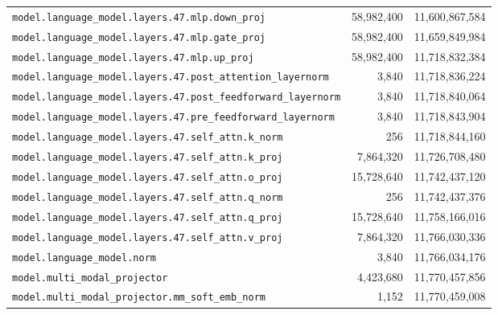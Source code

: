 \documentclass[10pt,a4paper]{article}
\theoremstyle{definition}
\begin{document}
\begin{appendices}
\begin{longtable}{p{9.5cm}rr}
\texttt{model.\allowbreak{}language\_model.\allowbreak{}layers.\allowbreak{}47.\allowbreak{}mlp.\allowbreak{}down\_proj} & 58,982,400 & 11,600,867,584 \\
\texttt{model.\allowbreak{}language\_model.\allowbreak{}layers.\allowbreak{}47.\allowbreak{}mlp.\allowbreak{}gate\_proj} & 58,982,400 & 11,659,849,984 \\
\texttt{model.\allowbreak{}language\_model.\allowbreak{}layers.\allowbreak{}47.\allowbreak{}mlp.\allowbreak{}up\_proj} & 58,982,400 & 11,718,832,384 \\
\texttt{model.\allowbreak{}language\_model.\allowbreak{}layers.\allowbreak{}47.\allowbreak{}post\_attention\_layernorm} & 3,840 & 11,718,836,224 \\
\texttt{model.\allowbreak{}language\_model.\allowbreak{}layers.\allowbreak{}47.\allowbreak{}post\_feedforward\_layernorm} & 3,840 & 11,718,840,064 \\
\texttt{model.\allowbreak{}language\_model.\allowbreak{}layers.\allowbreak{}47.\allowbreak{}pre\_feedforward\_layernorm} & 3,840 & 11,718,843,904 \\
\texttt{model.\allowbreak{}language\_model.\allowbreak{}layers.\allowbreak{}47.\allowbreak{}self\_attn.\allowbreak{}k\_norm} & 256 & 11,718,844,160 \\
\texttt{model.\allowbreak{}language\_model.\allowbreak{}layers.\allowbreak{}47.\allowbreak{}self\_attn.\allowbreak{}k\_proj} & 7,864,320 & 11,726,708,480 \\
\texttt{model.\allowbreak{}language\_model.\allowbreak{}layers.\allowbreak{}47.\allowbreak{}self\_attn.\allowbreak{}o\_proj} & 15,728,640 & 11,742,437,120 \\
\texttt{model.\allowbreak{}language\_model.\allowbreak{}layers.\allowbreak{}47.\allowbreak{}self\_attn.\allowbreak{}q\_norm} & 256 & 11,742,437,376 \\
\texttt{model.\allowbreak{}language\_model.\allowbreak{}layers.\allowbreak{}47.\allowbreak{}self\_attn.\allowbreak{}q\_proj} & 15,728,640 & 11,758,166,016 \\
\texttt{model.\allowbreak{}language\_model.\allowbreak{}layers.\allowbreak{}47.\allowbreak{}self\_attn.\allowbreak{}v\_proj} & 7,864,320 & 11,766,030,336 \\
\texttt{model.\allowbreak{}language\_model.\allowbreak{}norm} & 3,840 & 11,766,034,176 \\
\texttt{model.\allowbreak{}multi\_modal\_projector} & 4,423,680 & 11,770,457,856 \\
\texttt{model.\allowbreak{}multi\_modal\_projector.\allowbreak{}mm\_soft\_emb\_norm} & 1,152 & 11,770,459,008 \\

\end{longtable}
\end{appendices}
\end{document}
